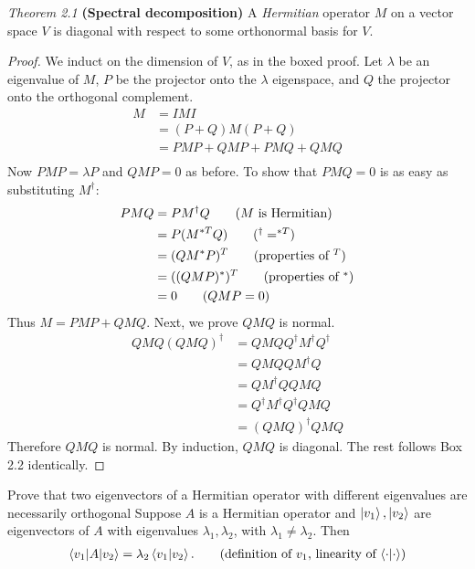 \noindent\textit{Theorem 2.1} \textbf{(Spectral decomposition)} A \textit{Hermitian} operator $M$ on a vector space $V$ is diagonal with respect to some orthonormal basis for $V$. 
\begin{proof} We induct on the dimension of $V$, as in the boxed proof.  Let $\lambda$ be an eigenvalue of $M$, $P$ be the projector onto the $\lambda$ eigenspace, and $Q$ the projector onto the orthogonal complement.
\begin{align*}
	M &= IMI \tag{trivial}\\
		&= (P+Q) M (P+Q)\tag{definition of $Q$}\\
		&= PMP + QMP + PMQ + QMQ\tag{expand}\\
\end{align*}
Now $PMP = \lambda P$ and $QMP = 0$ as before. To show that $PMQ = 0$ is as easy as substituting $M^\dagger$: 
\begin{align*}
PMQ &= PM^\dagger Q \tag{$M$ is Hermitian}\\
&= P(M^{*T}Q) \tag{$^{\dagger}=^{*T}$}\\
&=(QM^*P)^{T} \tag{properties of $^T$}\\
&=((QMP)^*)^T \tag{properties of $^*$}\\
&= 0 \tag{$QMP = 0$}
\end{align*}
Thus $M = PMP + QMQ$.
Next, we prove $QMQ$ is normal.
\begin{align*}
	QMQ (QMQ)^\dagger &= QMQ Q^\dagger M^\dagger Q^\dagger \tag{properties of $^\dagger$, and symmetry}\\
		&= QMQQM^\dagger Q \tag{projectors are Hermitian} \\
		&= QM^\dagger Q QMQ \tag{$M = M^\dagger$}\\
		&=Q^\dagger M^\dagger Q^\dagger QMQ \tag{projectors are Hermitian} \\
		&= (QMQ)^\dagger QMQ  \tag{properties of $^\dagger$, and symmetry}
\end{align*}
Therefore $QMQ$ is normal.
By induction, $QMQ$ is diagonal.  The rest follows Box 2.2 identically.
\end{proof}

 Prove that two eigenvectors of a Hermitian operator with different eigenvalues are necessarily orthogonal
\Soln
Suppose $A$ is a Hermitian operator and $\ket{v_1}, \ket{v_2}$ are eigenvectors of $A$ with eigenvalues $\lambda_1, \lambda_2$, with $\lambda_1\neq\lambda_2$.
Then
\begin{align*}
	\braket{v_1 | A | v_2} = \lambda_2 \braket{v_1 | v_2}. \tag{definition of $v_1$, linearity of $\braket{\cdot |\cdot}$}
\end{align*}

